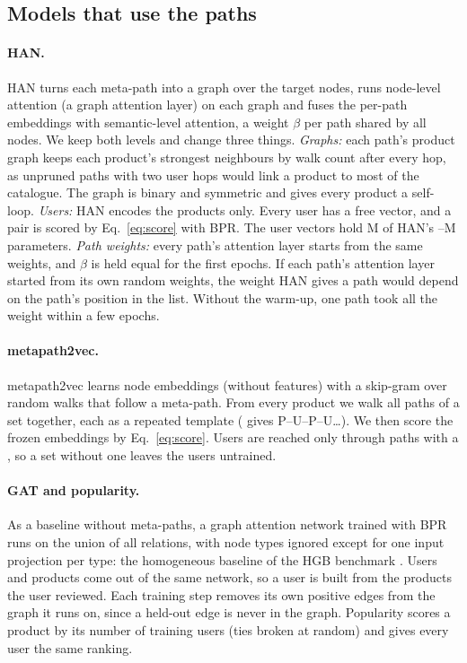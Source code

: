 \subsection{Models that use the paths}
\label{sec:models}

\paragraph{HAN\@.} HAN \citep{wang2019heterogeneous} turns each meta-path into a graph over the
target nodes, runs node-level attention (a graph attention layer) on each graph and fuses the
per-path embeddings with semantic-level attention, a weight $\beta$ per path shared by all nodes.
We keep both levels and change three things. \emph{Graphs:} each path's product graph keeps each
product's  strongest neighbours by walk count after every hop, as unpruned paths
with two user hops would link a product to most of the catalogue. The graph is binary and symmetric
and gives every product a self-loop. \emph{Users:} HAN encodes the products only. Every user has a
free vector, and a pair is scored by Eq.~\eqref{eq:score} with BPR. The user vectors hold
M of HAN's --M parameters.
\emph{Path weights:} every path's attention layer starts from the same weights, and $\beta$ is held
equal for the first  epochs. If each path's attention layer started from its
own random weights, the weight HAN gives a path would depend on the path's position in the list.
Without the warm-up, one path took all the weight within a few epochs.

\paragraph{metapath2vec.} metapath2vec \citep{dong2017metapath2vec} learns node embeddings (without
features) with a skip-gram over random walks that follow a meta-path. From every product we walk
all paths of a set together, each as a repeated template ( gives P--U--P--U\ldots). We
then score the frozen embeddings by Eq.~\eqref{eq:score}. Users are reached only through paths with a
, so a set without one leaves the users untrained.

\paragraph{GAT and popularity.} As a baseline without meta-paths, a graph attention network
\citep{velickovic2018graph} trained with BPR runs on the union of all relations, with node types
ignored except for one input projection per type: the homogeneous baseline of the HGB benchmark
\citep{lv2021hgb}. Users and products come out of the same network, so a user is built from the
products the user reviewed. Each training step removes its own positive edges from the graph it
runs on, since a held-out edge is never in the graph. Popularity scores a product by its number of
training users (ties broken at random) and gives every user the same ranking.

